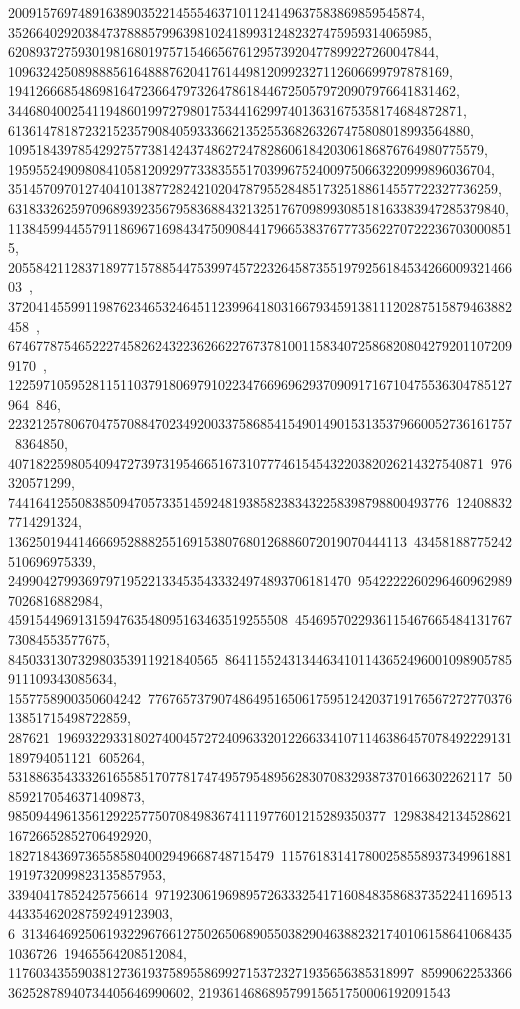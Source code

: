 {{{   20091576974891638903522145554637101124149637583869859545874, 
   352664029203847378885799639810241899312482327475959314065985, 
   6208937275930198168019757154665676129573920477899227260047844, 
   109632425089888561648887620417614498120992327112606699797878169, 
   1941266685486981647236647973264786184467250579720907976641831462, 
   34468040025411948601997279801753441629974013631675358174684872871, 
   613614781872321523579084059333662135255368263267475808018993564880, 
   10951843978542927577381424374862724782860618420306186876764980775579, 
   195955249098084105812092977338355517039967524009750663220999896036704, 
   3514570970127404101387728242102047879552848517325188614557722327736259, 
   63183326259709689392356795836884321325176709899308518163383947285379840, 
   1138459944557911869671698434750908441796653837677735622707222367030008515, 
   20558421128371897715788544753997457223264587355197925618453426600932146603\
, 
   372041455991198762346532464511239964180316679345913811120287515879463882458\
, 
   6746778754652227458262432236266227673781001158340725868208042792011072099170\
, 122597105952811511037918069791022347669696293709091716710475536304785127964\
846, 223212578067047570884702349200337586854154901490153135379660052736161757\
8364850, 40718225980540947273973195466516731077746154543220382026214327540871\
976320571299, 744164125508385094705733514592481938582383432258398798800493776\
124088327714291324, 136250194414666952888255169153807680126886072019070444113\
43458188775242510696975339, 2499042799369797195221334535433324974893706181470\
95422222602964609629897026816882984, 4591544969131594763548095163463519255508\
454695702293611546766548413176773084553577675, 845033130732980353911921840565\
86411552431344634101143652496001098905785911109343085634, 1557758900350604242\
776765737907486495165061759512420371917656727277037613851715498722859, 287621\
19693229331802740045727240963320122663341071146386457078492229131189794051121\
605264, 531886354333261655851707781747495795489562830708329387370166302262117\
508592170546371409873, 985094496135612922577507084983674111977601215289350377\
1298384213452862116726652852706492920, 18271843697365585804002949668748715479\
1157618314178002585589373499618811919732099823135857953, 33940417852425756614\
97192306196989572633325417160848358683735224116951344335462028759249123903, 6\
31346469250619322967661275026506890550382904638823217401061586410684351036726\
19465564208512084, 1176034355903812736193758955869927153723271935656385318997\
859906225336636252878940734405646990602, 219361468689579915651750006192091543\
}}}
